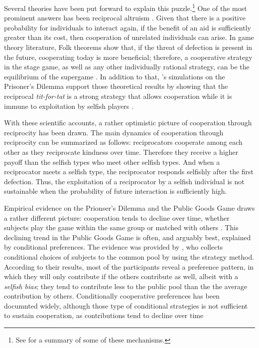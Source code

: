 \documentclass[12pt]{article}
\begin{document}
Several theories have been put forward to explain this puzzle.\footnote{See \citet{Nowak2006} for a summary of some of these mechanisms.} One of the most prominent answers has been reciprocal altruism \citep{Trivers1971, Axelrod1981-ot, may1987more, nowak1992tit,Nowak1993-gl}. 
Given that there is a positive probability for individuals to interact again, if the benefit of an aid is sufficiently greater than its cost, then cooperation of unrelated individuals can arise. In game theory literature, Folk theorems show that, if the threat of defection is present in the future, cooperating today is more beneficial; therefore, a cooperative strategy in the stage game, as well as any other individually rational strategy, can be the equilibrium of the supergame \citep{Friedman1971-nz, Fudenberg1986-dz}. In addition to that, \citeauthor{Axelrod1980a}'s simulations on the Prisoner's Dilemma  support those theoretical results by showing that the reciprocal \textit{tit-for-tat} is a strong strategy that allows cooperation while it is immune to exploitation by selfish players \citep{Axelrod1980a,Axelrod1980b,Axelrod1981-ot}. 

With these scientific accounts, a rather optimistic picture of cooperation through reciprocity has been drawn. The main dynamics of cooperation through reciprocity can be summarized as follows: reciprocators cooperate among each other as they reciprocate kindness over time. Therefore they receive a higher payoff than the selfish types who meet other selfish types. And when a reciprocator meets a selfish type, the reciprocator responds selfishly after the first defection. Thus, the exploitation of a reciprocator by a selfish individual is not sustainable when the probability of future interaction is sufficiently high. 

Empirical evidence on the Prionser's Dilemma and the Public Goods Game draws a rather different picture: cooperation tends to decline over time, whether subjects play the game within the same group or matched with others \citep{Selten1986-uc, Andreoni1993-ys, Cooper1996-be, ledyard1994public, Kim1984-wm, Isaac1985-qz, Andreoni2008-ec}. This declining trend in the Public Goods Game is often, and arguably best, explained by conditional preferences. The evidence was provided by \citet{Fischbacher2001}, who collects conditional choices of subjects to the common pool by using the strategy method. According to their results, most of the participants reveal a preference pattern, in which they will only contribute if the others contribute as well, albeit with a \textit{selfish bias}; they tend to contribute less to the public pool than the the average contribution by others. Conditionally cooperative preferences has been documnted widely, although those type of conditional strategies is not sufficient to sustain cooperation, as contributions tend to decline over time \citep{Kocher2008, Herrmann2009, Neugebauer2009, Fischbacher2010, ChaudhuriSustCoopExEc2011, hartig2015conditioning, andreozzi2020stability}
\end{document}
